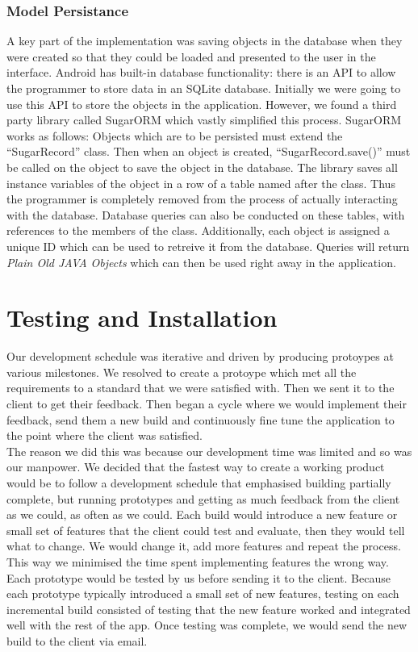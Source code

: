 \documentclass[12pt]{article}
\begin{document}
\subsubsection{Model Persistance}
A key part of the implementation was saving objects in the database when they were created so that they could be loaded and presented to the user in the interface. Android has built-in database functionality: there is an API to allow the programmer to store data in an SQLite database. Initially we were going to use this API to store the objects in the application. However, we found a third party library called SugarORM which vastly simplified this process. SugarORM works as follows: Objects which are to be persisted must extend the ``SugarRecord'' class. Then when an object is created, ``SugarRecord.save()'' must be called on the object to save the object in the database. The library saves all instance variables of the object in a row of a table named after the class. Thus the programmer is completely removed from the process of actually interacting with the database. Database queries can also be conducted on these tables, with references to the members of the class. Additionally, each object is assigned a unique ID which can be used to retreive it from the database. Queries will return \textit{Plain Old JAVA Objects} which can then be used right away in the application.

\section{Testing and Installation}
Our development schedule was iterative and driven by producing protoypes at various milestones. We resolved to create a protoype which met all the requirements to a standard that we were satisfied with. Then we sent it to the client to get their feedback. Then began a cycle where we would implement their feedback, send them a new build and continuously fine tune the application to the point where the client was satisfied. \\

The reason we did this was because our development time was limited and so was our manpower. We decided that the fastest way to create a working product would be to follow a development schedule that emphasised building partially complete, but running prototypes and getting as much feedback from the client as we could, as often as we could. Each build would introduce a new feature or small set of features that the client could test and evaluate, then they would tell what to change. We would change it, add more features and repeat the process. This way we minimised the time spent implementing features the wrong way. \\

Each prototype would be tested by us before sending it to the client. Because each prototype typically introduced a small set of new features, testing on each incremental build consisted of testing that the new feature worked and integrated well with the rest of the app. Once testing was complete, we would send the new build to the client via email. 
\end{document}

